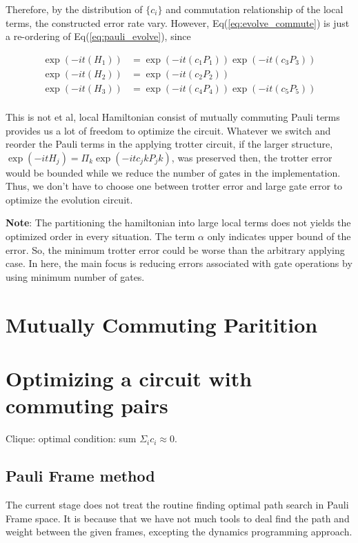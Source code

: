 \documentclass[a4paper,12pt]{article}
\begin{document}
Therefore, by the distribution of $\{c_i\}$ and commutation relationship of the local terms,
the constructed error rate vary.
However, Eq(\ref{eq:evolve_commute}) is just a re-ordering of Eq(\ref{eq:pauli_evolve}), since 

\begin{align}
    \exp(- i t (H_1)) &= \exp(- i t (c_1 P_1)) \exp(- i t (c_3 P_3)) \\ 
    \exp(- i t (H_2)) &= \exp(- i t (c_2 P_2))\\
    \exp(- i t (H_3)) &= \exp(- i t (c_4 P_4)) \exp(- i t (c_5 P_5)) \\ 
\end{align}

This is not et al, local Hamiltonian consist of mutually commuting Pauli terms provides us a lot of freedom
to optimize the circuit. 
Whatever we switch and reorder the Pauli terms in the applying trotter circuit,
if the larger structure, $\exp(-it H_j) = \Pi_k \exp(-it c_jk P_jk)$, was preserved then, 
the trotter error would be bounded while we reduce the number of gates in the implementation.
Thus, we don't have to choose one between trotter error and large gate error
to optimize the evolution circuit.

\textbf{Note}: The partitioning the hamiltonian into large local terms does not yields the optimized 
order in every situation. 
The term $\alpha$ only indicates upper bound of the error. So, the minimum trotter error could be 
worse than the arbitrary applying case. 
In here, the main focus is reducing errors associated with gate operations by using minimum
number of gates.

\section{Mutually Commuting Paritition}


\section{Optimizing a circuit with commuting pairs}

Clique: optimal condition: sum $ \Sigma_{i} c_i \approx 0 $.

\subsection{Pauli Frame method}

The current stage does not treat the routine finding 
optimal path search in Pauli Frame space.
It is because that we have not much tools to deal 
find the path and weight between the given frames,
excepting the dynamics programming approach.
\end{document}
